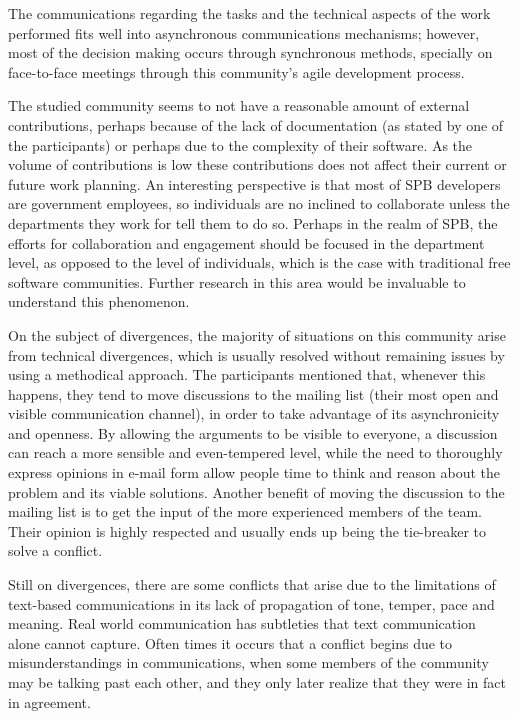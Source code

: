 \documentclass{sigchi}
\begin{document}
The communications regarding the tasks and the technical aspects of the work performed fits well into asynchronous communications mechanisms; however, most of the decision making occurs through synchronous methods, specially on face-to-face meetings through this community's agile development process. 

The studied community seems to not have a reasonable amount of external contributions, perhaps because of the lack of documentation (as stated by one of the participants) or perhaps due to the complexity of their software. As the volume of contributions is low these contributions does not affect their current or future work planning. An interesting perspective is that most of SPB developers are government employees, so individuals are no inclined to collaborate unless the departments they work for tell them to do so. Perhaps in the realm of SPB, the efforts for collaboration and engagement should be focused in the department level, as opposed to the level of individuals, which is the case with traditional free software communities. Further research in this area would be invaluable to understand this phenomenon. 

On the subject of divergences, the majority of situations on this community arise from technical divergences, which is usually resolved without remaining issues by using a methodical approach. The participants mentioned that, whenever this happens, they tend to move discussions to the mailing list (their most open and visible communication channel), in order to take advantage of its asynchronicity and openness. By allowing the arguments to be visible to everyone, a discussion can reach a more sensible and even-tempered level, while the need to thoroughly express opinions in e-mail form allow people time to think and reason about the problem and its viable solutions. Another benefit of moving the discussion to the mailing list is to get the input of the more experienced members of the team. Their opinion is highly respected and usually ends up being the tie-breaker to solve a conflict.

Still on divergences, there are some conflicts that arise due to the limitations of text-based communications in its lack of propagation of tone, temper, pace and meaning. Real world communication has subtleties that text communication alone cannot capture. Often times it occurs that a conflict begins due to misunderstandings in communications, when some members of the community may be talking past each other, and they only later realize that they were in fact in agreement.
\end{document}
